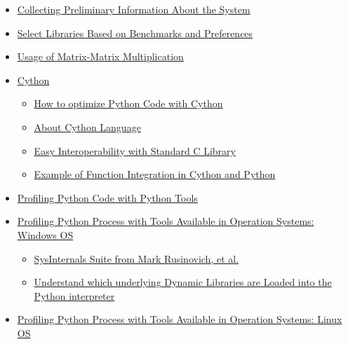 \documentclass[
]{article}
\begin{document}
\begin{itemize}
  \begin{itemize}
  \item
    \protect\hyperlink{collecting-preliminary-information-about-the-system}{Collecting
    Preliminary Information About the System}
  \item
    \protect\hyperlink{select-libraries-based-on-benchmarks-and-preferences}{Select
    Libraries Based on Benchmarks and Preferences}
  \item
    \protect\hyperlink{usage-of-matrix-matrix-multiplication}{Usage of
    Matrix-Matrix Multiplication}
  \item
    \protect\hyperlink{cython}{Cython}

    \begin{itemize}
    \item
      \protect\hyperlink{how-to-optimize-python-code-with-cython}{How to
      optimize Python Code with Cython}
    \item
      \protect\hyperlink{about-cython-language}{About Cython Language}
    \item
      \protect\hyperlink{easy-interoperability-with-standard-c-library}{Easy
      Interoperability with Standard C Library}
    \item
      \protect\hyperlink{example-of-function-integration-in-cython-and-python}{Example
      of Function Integration in Cython and Python}
    \end{itemize}
  \item
    \protect\hyperlink{profiling-python-code-with-python-tools}{Profiling
    Python Code with Python Tools}
  \item
    \protect\hyperlink{profiling-python-process-with-tools-available-in-operation-systems-windows-os}{Profiling
    Python Process with Tools Available in Operation Systems: Windows
    OS}

    \begin{itemize}
    \item
      \protect\hyperlink{sysinternals-suite-from-mark-rusinovich-et-al}{SysInternals
      Suite from Mark Rusinovich, et al.}
    \item
      \protect\hyperlink{understand-which-underlying-dynamic-libraries-are-loaded-into-the-python-interpreter}{Understand
      which underlying Dynamic Libraries are Loaded into the Python
      interpreter}
    \end{itemize}
  \item
    \protect\hyperlink{profiling-python-process-with-tools-available-in-operation-systems-linux-os}{Profiling
    Python Process with Tools Available in Operation Systems: Linux OS}


\end{itemize}
\end{itemize}
\end{document}
